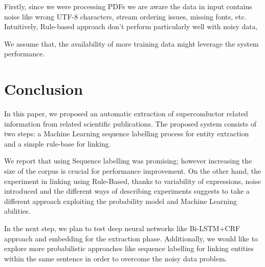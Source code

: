 \documentclass{article}[a4]
\begin{document}
Firstly, since we were processing PDFs we are aware the data in input contains noise like wrong UTF-8 characters, stream ordering issues, missing fonts, etc. Intuitively, Rule-based approach don't perform particularly well with noisy data, 
 
We assume that, the availability of more training data might leverage the system performance.

\section{Conclusion}
\label{sec:conclusion}
In this paper, we proposed an automatic extraction of superconductor related information from related scientific publications. The proposed system consists of two steps: a Machine Learning sequence labelling process for entity extraction and a simple rule-base for linking. 

We report that using Sequence labelling was promising; however increasing the size of the corpus is crucial for performance improvement. On the other hand, the experiment in linking using Rule-Based, thanks to variability of expressions, noise introduced and the different ways of describing experiments suggests to take a different approach exploiting the probability model and Machine Learning abilities. 

In the next step, we plan to test deep neural networks like Bi-LSTM+CRF approach and embedding for the extraction phase. 
Additionally, we would like to explore more probabilistic approaches like sequence labelling for linking entities within the same sentence in order to overcome the noisy data problem.

\pagebreak



\end{document}
